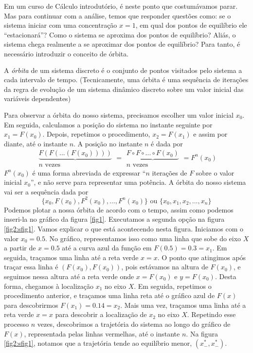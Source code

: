 \documentclass{article}
\newenvironment{definition}[1][Definição]{\begin{trivlist}
\item[\hskip \labelsep {\bfseries #1}]}{\end{trivlist}}
\begin{document}
Em um curso de Cálculo introdutório, é neste ponto que costumávamos parar. Mas para continuar com a análise, temos que responder questões como: se o sistema iniciar com uma concentração $x = 1$, em qual dos pontos de equilíbrio ele ``estacionará''? Como o sistema se aproxima dos pontos de equilíbrio? Aliás, o sistema chega realmente a se aproximar dos pontos de equilíbrio? Para tanto, é necessário introduzir o conceito de órbita.

\begin{definition}
A \emph{órbita} de um sistema discreto é o conjunto de pontos visitados pelo sistema a cada intervalo de tempo. (Tecnicamente, uma órbita é uma sequência de iterações da regra de evolução de um sistema dinâmico discreto sobre um valor inicial das variáveis dependentes)
\end{definition}


Para observar a órbita do nosso sistema, precisamos escolher um valor inicial $x_0$. Em seguida, calculamos a posição do sistema no instante seguinte por $x_1 = F(x_0)$. Depois, repetimos o procedimento, $x_2 = F(x_1)$ e assim por diante, até o instante $n$. A posição no instante $n$ é dada por 
\[
\begin{array}{c}
 \underbrace{F(F(...(F(x_0))))} \\ n \textrm{ vezes}
\end{array} 
= 
\begin{array}{c}
 \underbrace{F \circ F \circ ... \circ F(x_0)} \\ n \textrm{ vezes}
\end{array} 
=
F^n(x_0)
\]
$F^n(x_0)$ é uma forma abreviada de expressar ``$n$ iterações de $F$ sobre o valor inicial $x_0$'', e não serve para representar uma potência. A órbita do nosso sistema vai ser a sequência dada por 
\[
\{x_0,F(x_0),F^2(x_0),...,F^n(x_0)\}\textrm{ ou } \{x_0,x_1,x_2,...,x_n\}
\]
Podemos plotar a nossa órbita de acordo com o tempo, assim como podemos inseri-la no gráfico da figura \ref{fig1}. Executamos a segunda opção na figura \ref{fig2:sfig1}. Vamos explicar o que está acontecendo nesta figura. Iniciamos com o valor $x_0 = 0.5$. No gráfico, representamos isso como uma linha que sobe do eixo $X$ a partir de $x = 0.5$ até a curva azul da função em $F(0.5) = 0.3 = x_1$. Em seguida, traçamos uma linha até a reta verde $x=x$. O ponto que atingimos após traçar essa linha é $(F(x_0),F(x_0))$, pois estávamos na altura de $F(x_0)$, e seguimos nessa altura até a reta verde onde $x = F(x_0)$ e $y = F(x_0)$. Desta forma, chegamos à localização $x_1$ no eixo $X$. Em seguida, repetimos o procedimento anterior, e traçamos uma linha reta até o gráfico azul de $F(x)$ para descobrirmos $F(x_1) = 0.14 = x_2$. Mais uma vez, traçamos uma linha até a reta verde $x=x$ para descobrir a localização de $x_2$ no eixo $X$. Repetindo esse processo $n$ vezes, descobrimos a trajetória do sistema ao longo do gráfico de $F(x)$, representada pelas linhas vermelhas, até o instante $n$. Na figura \ref{fig2:sfig1}, notamos que a trajetória tende ao equilíbrio menor, $(x^*_-,x^*_-)$.
\end{document}
